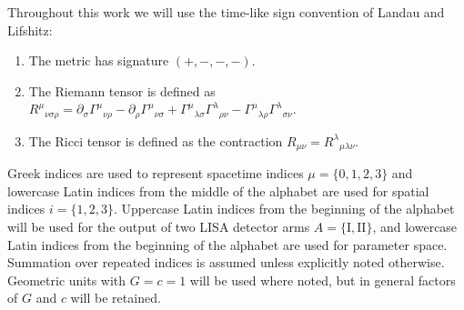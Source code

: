 Throughout this work we will use the time-like sign convention of Landau and Lifshitz\cite{Landau1975}:
\begin{enumerate}
\item The metric has signature $(+,-,-,-)$.
\item The Riemann tensor is defined as ${R^\mu}_{\nu\sigma\rho} = \partial_\sigma {\Gamma^\mu}_{\nu\rho} - \partial_\rho {\Gamma^\mu}_{\nu\sigma} + {\Gamma^\mu}_{\lambda\sigma}{\Gamma^\lambda}_{\rho\nu} - {\Gamma^\mu}_{\lambda\rho}{\Gamma^\lambda}_{\sigma\nu}$.
\item The Ricci tensor is defined as the contraction $R_{\mu\nu} = {R^\lambda}_{\mu\lambda\nu}$.
\end{enumerate}
Greek indices are used to represent spacetime indices $\mu = \{0,1,2,3\}$ and lowercase Latin indices from the middle of the alphabet are used for spatial indices $i = \{1,2,3\}$. Uppercase Latin indices from the beginning of the alphabet will be used for the output of two LISA detector arms $A = \{\mathrm{I}, \mathrm{II}\}$, and lowercase Latin indices from the beginning of the alphabet are used for parameter space. Summation over repeated indices is assumed unless explicitly noted otherwise. Geometric units with $G = c = 1$ will be used where noted, but in general factors of $G$ and $c$ will be retained.
